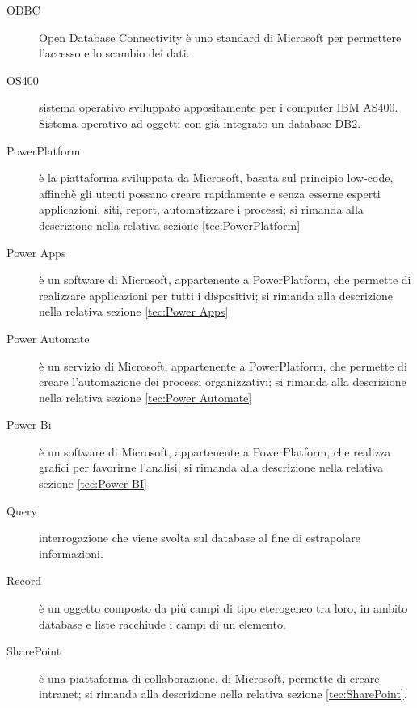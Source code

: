 \begin{description}
    \item[ODBC] Open Database Connectivity è uno standard di Microsoft per permettere l'accesso e lo scambio dei dati.
    \item[OS400] sistema operativo sviluppato appositamente per i computer IBM AS400. Sistema operativo ad oggetti con già integrato un database DB2.
    \item[PowerPlatform] è la piattaforma sviluppata da Microsoft, basata sul principio low-code, affinchè gli utenti possano creare rapidamente e senza esserne esperti applicazioni, siti, report, automatizzare i processi; si rimanda alla descrizione nella relativa sezione \ref*{tec:PowerPlatform}
    \item[Power Apps] è un software di Microsoft, appartenente a PowerPlatform, che permette di realizzare applicazioni per tutti i dispositivi; si rimanda alla descrizione nella relativa sezione \ref*{tec:Power Apps}
    \item[Power Automate] è un servizio di Microsoft, appartenente a PowerPlatform, che permette di creare l'automazione dei processi organizzativi; si rimanda alla descrizione nella relativa sezione \ref*{tec:Power Automate}
    \item[Power Bi] è un software di Microsoft, appartenente a PowerPlatform, che realizza grafici per favorirne l'analisi; si rimanda alla descrizione nella relativa sezione \ref*{tec:Power BI} 
    \item[Query] interrogazione che viene svolta sul database al fine di estrapolare informazioni.
    \item[Record] è un oggetto composto da più campi di tipo eterogeneo tra loro, in ambito database e liste racchiude i campi di un elemento.
    \item[SharePoint] è una piattaforma di collaborazione, di Microsoft, permette di creare intranet; si rimanda alla descrizione nella relativa sezione \ref*{tec:SharePoint}.
\end{description}

